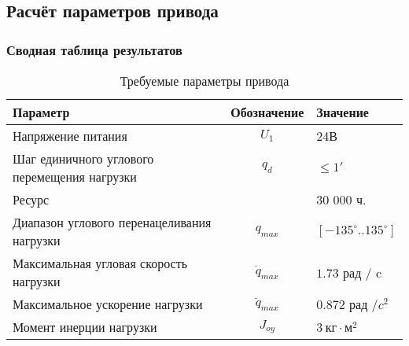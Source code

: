 \subsection{Расчёт параметров привода}



\subsubsection{Сводная таблица результатов}

\begin{table}[h!]
    \centering
    \begin{tabular}{|l|c|l|}
        \hline
        Параметр                                    & Обозначение      & Значение                           \\
        \hline
        Напряжение питания                          & $U_1$            & 24В                                \\
        Шаг единичного углового перемещения нагрузки& $q_d$            & $ \le 1' $                         \\
        Ресурс                                      &                  & 30 000 ч.                          \\
        Диапазон углового перенацеливания нагрузки  & $q_{max}$        & $[-135^\circ .. 135^\circ] $       \\
        Максимальная угловая скорость нагрузки      & $\dot{q}_{max}$  & $1.73$ рад / c                     \\
        Максимальное ускорение нагрузки             & $\ddot{q}_{max}$ & $0.872$ рад /$c^2$                 \\
        Момент инерции нагрузки                     & $J_{oy}$         & $3 ~\text{кг} \cdot \text{м}^2 $   \\
        \hline
    \end{tabular}
    \caption{Требуемые параметры привода}
    \label{drive_parameters_tbl}
\end{table}

\endinput
